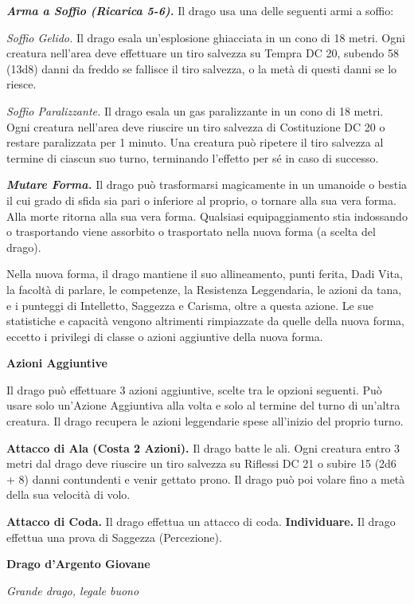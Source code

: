 \begin{multicols}{2}
\emph{\textbf{Arma a Soffio (Ricarica 5-6).}} Il drago usa una delle
seguenti armi a soffio:

\emph{Soffio Gelido.} Il drago esala un'esplosione ghiacciata in un cono
di 18 metri. Ogni creatura nell'area deve effettuare un tiro salvezza su Tempra DC 20, subendo 58 (13d8) danni da freddo se fallisce il
tiro salvezza, o la metà di questi danni se lo riesce.

\emph{Soffio Paralizzante.} Il drago esala un gas paralizzante in un
cono di 18 metri. Ogni creatura nell'area deve riuscire un tiro salvezza
di Costituzione DC 20 o restare paralizzata per 1 minuto. Una creatura
può ripetere il tiro salvezza al termine di ciascun suo turno,
terminando l'effetto per sé in caso di successo.

\emph{\textbf{Mutare Forma.}} Il drago può trasformarsi magicamente in
un umanoide o bestia il cui grado di sfida sia pari o inferiore al
proprio, o tornare alla sua vera forma. Alla morte ritorna alla sua vera
forma. Qualsiasi equipaggiamento stia indossando o trasportando viene
assorbito o trasportato nella nuova forma (a scelta del drago).

Nella nuova forma, il drago mantiene il suo allineamento, punti ferita,
Dadi Vita, la facoltà di parlare, le competenze, la Resistenza
Leggendaria, le azioni da tana, e i punteggi di Intelletto, Saggezza e
Carisma, oltre a questa azione. Le sue statistiche e capacità vengono
altrimenti rimpiazzate da quelle della nuova forma, eccetto i privilegi
di classe o azioni aggiuntive della nuova forma.

\textbf{Azioni Aggiuntive}

Il drago può effettuare 3 azioni aggiuntive, scelte tra le opzioni
seguenti. Può usare solo un'Azione Aggiuntiva alla volta e solo al
termine del turno di un'altra creatura. Il drago recupera le azioni
leggendarie spese all'inizio del proprio turno.

\textbf{Attacco di Ala (Costa 2 Azioni).} Il drago batte le ali. Ogni
creatura entro 3 metri dal drago deve riuscire un tiro salvezza su Riflessi DC 21 o subire 15 (2d6 + 8) danni contundenti e venir gettato
prono. Il drago può poi volare fino a metà della sua velocità di volo.

\textbf{Attacco di Coda.} Il drago effettua un attacco di coda.
\textbf{Individuare.} Il drago effettua una prova di Saggezza
(Percezione).

\textbf{Drago d'Argento Giovane}

\emph{Grande drago, legale buono}


\end{multicols}
